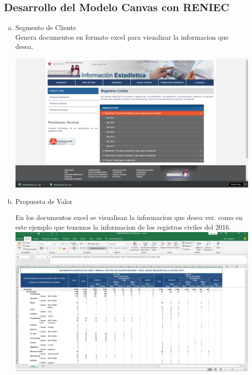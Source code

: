 \begin{enumerate}[1.]
\begin{enumerate}[a)]
\subsection{Desarrollo del Modelo Canvas con RENIEC}		
		\end{enumerate}
\begin{enumerate}[a)]
			\item Segmento de Cliente \\
Genera documentos en formato excel para visualizar la informacion que desea.
	        \begin{center}
                    \includegraphics[scale=0.30]{./Imagenes/a.png}
                    \end{center}
\item Propuesta de Valor \\
		 \begin{center}
	En los documentos excel se visualisan la informacion que desea ver. como en este ejemplo que tenemos la informacion de los registros civiles del 2016.
                    \includegraphics[scale=0.30]{./Imagenes/b.png}
                    \end{center}


\end{enumerate}
\end{enumerate}
